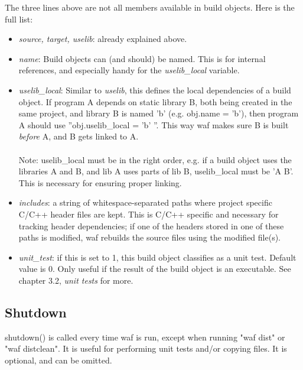 \documentclass[a4,10pt]{article}
\begin{document}
\vspace{10mm}
The three lines above are not all members available in build objects. Here is the full list:
\begin{itemize}

\item \emph{source, target, uselib}: already explained above.

\item \emph{name}: Build objects can (and should) be named. This is for internal references, and especially handy for the \emph{uselib\_local} variable.

\item \emph{uselib\_local}: Similar to \emph{uselib}, this defines the local dependencies of a build object. If program A depends on static library B, both being created in the same project, and library B is named 'b' (e.g. obj.name = 'b'), then program A should use ''obj.uselib\_local = 'b' ''. This way waf makes sure B is built \emph{before} A, and B gets linked to A.\\
\\
Note: uselib\_local must be in the right order, e.g. if a build object uses the libraries A and B, and lib A uses parts of lib B, uselib\_local must be 'A B'. This is necessary for ensuring proper linking.

\item \emph{includes}: a string of whitespace-separated paths where project specific C/C++ header files are kept. This is C/C++ specific and necessary for tracking header dependencies; if one of the headers stored in one of these paths is modified, waf rebuilds the source files using the modified file(s).

\item \emph{unit\_test}: if this is set to 1, this build object classifies as a unit test. Default value is 0. Only useful if the result of the build object is an executable. See chapter 3.2, \emph{unit tests} for more.

\end{itemize}

\subsection{Shutdown}
shutdown() is called every time waf is run, except when running "waf dist" or "waf distclean". It is useful for performing unit tests and/or copying files. It is optional, and can be omitted.
\end{document}
